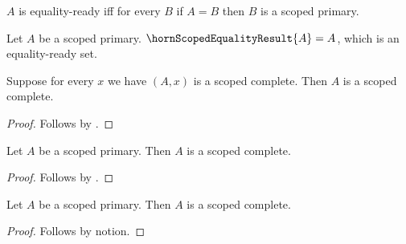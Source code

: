 

\begin{abbreviation}\label{horn_scoped_equality_ready}
    $A$ is equality-ready iff for every $B$ if $A=B$ then $B$ is a scoped primary.
\end{abbreviation}

\begin{definition}\label{horn_scoped_equality_result}
    Let $A$ be a scoped primary.
    $\hornScopedEqualityResult{A}=A$, which is an equality-ready set.
\end{definition}

\begin{classification}\label{horn_scoped_recursive}
    Suppose for every $x$ we have $(A,x)$ is a scoped complete.
    Then $A$ is a scoped complete.
\end{classification}
\begin{proof}
    Follows by .
\end{proof}

\begin{classification}\label{horn_scoped_easy}
    Let $A$ be a scoped primary.
    Then $A$ is a scoped complete.
\end{classification}
\begin{proof}
    Follows by .
\end{proof}

\begin{proposition}\label{horn_scoped_fair}
    Let $A$ be a scoped primary.
    Then $A$ is a scoped complete.
\end{proposition}
\begin{proof}
    Follows by notion.
\end{proof}
